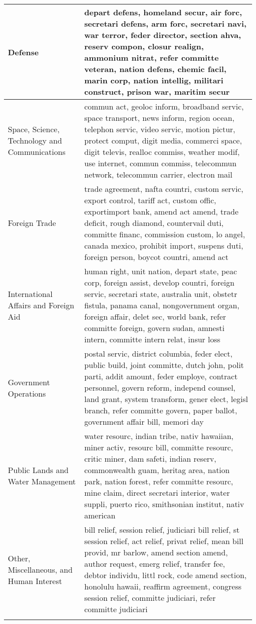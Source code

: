 \begin{longtable}{p{}p{}}
   \hline
Defense & depart defens, homeland secur, air forc, secretari defens, arm forc, secretari navi, war terror, feder director, section ahva, reserv compon, closur realign, ammonium nitrat, refer committe veteran, nation defens, chemic facil, marin corp, nation intellig, militari construct, prison war, maritim secur \\ 
   \hline
Space, Science, Technology and Communications & commun act, geoloc inform, broadband servic, space transport, news inform, region ocean, telephon servic, video servic, motion pictur, protect comput, digit media, commerci space, digit televis, realloc commiss, weather modif, use internet, commun commiss, telecommun network, telecommun carrier, electron mail \\ 
   \hline
Foreign Trade & trade agreement, nafta countri, custom servic, export control, tariff act, custom offic, exportimport bank, amend act amend, trade deficit, rough diamond, countervail duti, committe financ, commission custom, lo angel, canada mexico, prohibit import, suspens duti, foreign person, boycot countri, amend act \\ 
   \hline
International Affairs and Foreign Aid & human right, unit nation, depart state, peac corp, foreign assist, develop countri, foreign servic, secretari state, australia unit, obstetr fistula, panama canal, nongovernment organ, foreign affair, delet sec, world bank, refer committe foreign, govern sudan, amnesti intern, committe intern relat, insur loss \\ 
   \hline
Government Operations & postal servic, district columbia, feder elect, public build, joint committe, dutch john, polit parti, addit amount, feder employe, contract personnel, govern reform, independ counsel, land grant, system transform, gener elect, legisl branch, refer committe govern, paper ballot, government affair bill, memori day \\ 
   \hline
Public Lands and Water Management & water resourc, indian tribe, nativ hawaiian, miner activ, resourc bill, committe resourc, critic miner, dam safeti, indian reserv, commonwealth guam, heritag area, nation park, nation forest, refer committe resourc, mine claim, direct secretari interior, water suppli, puerto rico, smithsonian institut, nativ american \\ 
   \hline
Other, Miscellaneous, and Human Interest & bill relief, session relief, judiciari bill relief, st session relief, act relief, privat relief, mean bill provid, mr barlow, amend section amend, author request, emerg relief, transfer fee, debtor individu, littl rock, code amend section, honolulu hawaii, reaffirm agreement, congress session relief, committe judiciari, refer committe judiciari \\ 
   \hline
\hline
\label{tab:top20_major}
\end{longtable}
\endgroup

